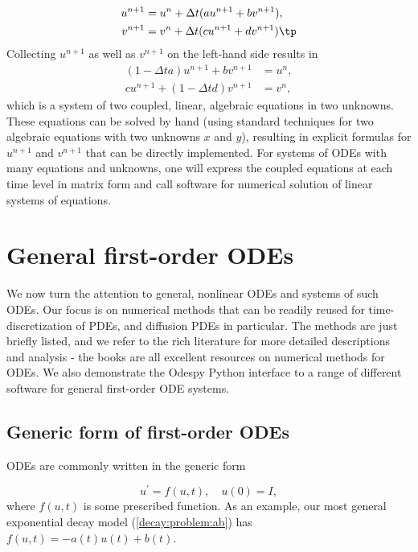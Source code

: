 \documentclass[graybox,sectrefs,envcountresetchap,open=right,final]{svmonodo}
\begin{document}
\begin{align}
u^{n+1} &= u^n + \Delta t (a u^{n+1} + b v^{n+1}),\\ 
v^{n+1} &= v^n + \Delta t (c u^{n+1} + d v^{n+1})\tp
\end{align}
Collecting $u^{n+1}$ as well as $v^{n+1}$ on the left-hand side results
in
\begin{align}
(1 - \Delta t a)u^{n+1} + bv^{n+1} &= u^n ,\\ 
c u^{n+1} + (1 - \Delta t d) v^{n+1} &= v^n ,
\end{align}
which is a system of two coupled, linear, algebraic equations in two
unknowns. These equations can be solved by hand (using standard
techniques for two algebraic equations with two unknowns $x$ and $y$),
resulting in explicit formulas for $u^{n+1}$ and $v^{n+1}$ that can be
directly implemented. For systems of ODEs with many equations and unknowns, one
will express the coupled equations at each time level in matrix form
and call software for numerical solution of linear systems of equations.


\section{General first-order ODEs}

We now turn the attention to general, nonlinear ODEs and systems of
such ODEs.  Our focus is on numerical methods that can be readily
reused for time-discretization of PDEs, and diffusion PDEs in particular.
The methods are just briefly listed, and we refer to the rich literature
for more detailed descriptions and analysis - the books
\cite{Petzold_Ascher_1998,Griffiths_et_al_2010,Hairer_Wanner_Norsett_bookI,Hairer_Wanner_bookII} are all excellent resources on numerical methods for ODEs.
We also demonstrate the Odespy Python interface to a range
of different software for general first-order ODE systems.

\subsection{Generic form of first-order ODEs}

ODEs are commonly written in the generic form

\begin{equation}
u^{\prime} = f(u,t),\quad u(0)=I,
\label{decay:ode:general}
\end{equation}
where $f(u,t)$  is some prescribed function.
As an example, our most
general exponential decay model (\ref{decay:problem:ab}) has
$f(u,t)=-a(t)u(t) + b(t)$.
\end{document}
